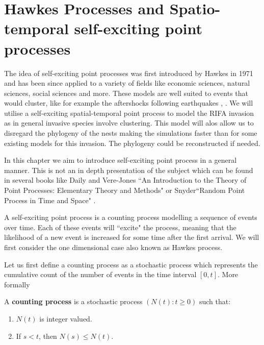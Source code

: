 \chapter[Hawkes Processes and Spatio-temporal self-exciting point processes]{Hawkes Processes and Spatio-temporal self-exciting point processes}
\label{ch:Hawkes}

The idea of self-exciting point processes was first introduced by Hawkes in 1971 \cite{Hawkes71} and has been since applied to a variety of fields like economic sciences, natural sciences, social sciences and more. These models are well suited to events that would cluster, like for example the aftershocks following earthquakes \cite{Ogata88}, \cite{Mohler}. We will utilise a self-exciting spatial-temporal point process to model the RIFA invasion as in general invasive species involve clustering. This model will alos allow us to disregard the phylogeny of the nests making the simulations faster than for some existing models for this invasion. The phylogeny could be reconstructed if needed.

In this chapter we aim to introduce self-exciting point process in a general manner. This is not an in depth presentation of the subject which can be found in several books like Daily and Vere-Jones ``An Introduction to the Theory of Point Processes: Elementary Theory and Methods" \cite{Daley} or Snyder``Random Point Process in Time and Space" \cite{Snyder}.

A self-exciting point process is a counting process modelling a sequence of events over time. Each of these events will ``excite" the process, meaning that the likelihood of a new event is increased for some time after the first arrival. We will first consider the one dimensional case also known as Hawkes process.

Let us first define a counting process as a stochastic process which represents the cumulative count of the number of events in the time interval $[0, t]$. More formally

\begin{definition}
    A \textbf{counting process} is a stochastic process $(N(t) : t \geq 0)$ such that:
    \begin{enumerate}[label=(\roman*)]
        \item $N(t)$ is integer valued.
        \item If $s<t$, then $N(s) \leq N(t)$.
    \end{enumerate}
\end{definition}

